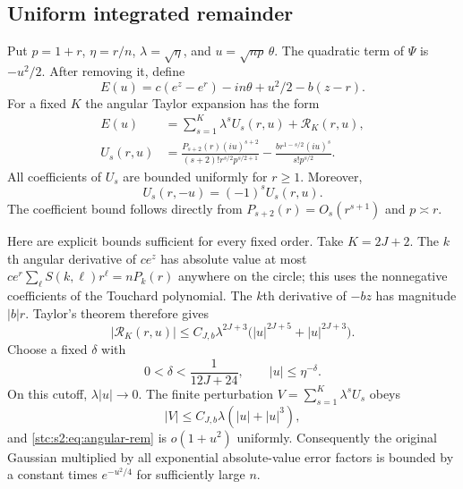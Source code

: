 \documentclass[11pt,letterpaper]{article}
\numberwithin{equation}{section}
\theoremstyle{remark}\newtheorem{remark}[theorem]{Remark}
\begin{document}
\subsection{Uniform integrated remainder}\label{stc:s2:sec:remainder}
Put $p=1+r$, $\eta=r/n$, $\lambda=\sqrt\eta$, and $u=\sqrt{np}\,\theta$. The quadratic term of $\Psi$ is $-u^2/2$. After removing it, define
\[
 E(u)=c(e^z-e^r)-in\theta+u^2/2-b(z-r).
\]
For a fixed $K$ the angular Taylor expansion has the form
\begin{align}
 E(u)&=\sum_{s=1}^K\lambda^s U_s(r,u)+\mathcal R_K(r,u),\label{stc:s2:eq:local-exponent}\\
 U_s(r,u)&=
 \frac{P_{s+2}(r)(iu)^{s+2}}{(s+2)!r^{s/2}p^{s/2+1}}
 -\frac{br^{1-s/2}(iu)^s}{s!p^{s/2}}.\label{stc:s2:eq:Us}
\end{align}
All coefficients of $U_s$ are bounded uniformly for $r\ge1$. Moreover,
\begin{equation}\label{stc:s2:eq:parity}
 U_s(r,-u)=(-1)^sU_s(r,u).
\end{equation}
The coefficient bound follows directly from $P_{s+2}(r)=O_s(r^{s+1})$ and $p\asymp r$.

Here are explicit bounds sufficient for every fixed order. Take $K=2J+2$. The $k$th angular derivative of $ce^z$ has absolute value at most $ce^r\sum_\ell S(k,\ell)r^\ell=nP_k(r)$ anywhere on the circle; this uses the nonnegative coefficients of the Touchard polynomial. The $k$th derivative of $-bz$ has magnitude $|b|r$. Taylor's theorem therefore gives
\begin{equation}\label{stc:s2:eq:angular-rem}
 |\mathcal R_K(r,u)|\le C_{J,b}\lambda^{2J+3}
 \bigl(|u|^{2J+5}+|u|^{2J+3}\bigr).
\end{equation}
Choose a fixed $\delta$ with
\begin{equation}\label{stc:s2:eq:delta}
 0<\delta<\frac1{12J+24},\qquad |u|\le\eta^{-\delta}.
\end{equation}
On this cutoff, $\lambda|u|\to0$. The finite perturbation $V=\sum_{s=1}^K\lambda^sU_s$ obeys
\begin{equation}\label{stc:s2:eq:Vbound}
 |V|\le C_{J,b}\lambda(|u|+|u|^3),
\end{equation}
and \eqref{stc:s2:eq:angular-rem} is $o(1+u^2)$ uniformly. Consequently the original Gaussian multiplied by all exponential absolute-value error factors is bounded by a constant times $e^{-u^2/4}$ for sufficiently large $n$.
\end{document}
